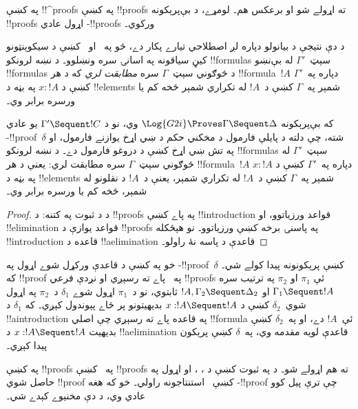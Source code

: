 \documentclass[../../../include/open-logic-section]{subfiles}
\begin{document}


په  کښې !!^{proof}s په  کښې
!!{proof}s ته اړولے شو او برعکس هم۔ لومړے، د بې‌پرېکونه
 !!{proof}s اړول عادي -!!{proof}s ورکوي۔

د دې نتيجې د بيانولو دپاره لږ اصطلاحي تيارے پکار دے، څو
په~ او~ کښې د سيکوېنټونو کيڼ سياقونه په
اسانۍ سره ونښلوو۔ د نښه لرونکو !!{formula}s سېټ~$\Gamma'$
له بې‌نښو !!{formula}s د څوګوني سېټ~$\Gamma$ سره
\emph{مطابقت لري} که د هر !!{formula}~$!A$ دپاره په~$\Gamma'$
کښې د $x : !A$ په بڼه د !!{element}s شمېر په~$\Gamma$ کښې
د~$!A$ له تکراري شمېر څخه کم يا ورسره برابر وي۔

\begin{cor}
که بې‌پرېکونه $\Log{G2i} \Proves \Gamma \Sequent \Delta$
وي، نو د $\Gamma' \Sequent !C$ يو عادي
-!!{proof}~$\delta$ شته، چې دلته د پايلې فارمول
د مخکني حکم د ښي اړخ يوازنے فارمول، او په تش ښي اړخ کښې
د دروغو فارمول دے۔ د نښه لرونکو !!{formula}s سېټ~$\Gamma'$
له څوګوني سېټ~$\Gamma$ سره مطابقت لري: يعنې د هر
!!{formula}~$!A$ دپاره په~$\Gamma'$ کښې د $x : !A$ په بڼه
د !!{element}s شمېر په~$\Gamma$ کښې د~$!A$ له تکراري شمېر،
يعنې د~$!A$ د نقلونو له شمېر، څخه کم يا ورسره برابر وي۔
\end{cor}

\begin{proof}
د  د ثبوت په کتنه: د
!!{proof}s په پاے کښې !!{introduction} قواعد ورزياتوو، او
!!{elimination} قواعد يوازې د !!{proof}s په پاسنۍ برخه کښې
ورزياتوو۔ نو هېڅکله !!{introduction} قاعده د
!!a{elimination} قاعدې د پاسه نۀ راولو۔
\end{proof}

خو په  کښې د \Cut{} قاعدې
ورکړل شوے اړول په -!!{proof}~$\delta$ کښې
پرېکونونه پيدا کولے شي۔ که  !!{proof} په~\Cut{}
پاے ته رسېږي او نږدې فرعي !!{proof}s ئې $\pi_1$ او $\pi_2$
په ترتيب سره $\Gamma_1 \Sequent !A$ او
$!A, \Gamma_2 \Sequent \Delta_2$ ثابتوي، نو د~$\pi_1$
اړول شوے $\delta_1$ د~$\pi_2$ په اړول شوي~$\delta_2$ کښې
د $x:!A \Sequent !A$ بديهيتونو پر ځاے پېوندول کېږي۔ که
$\delta_1$ د !!a{introduction} په قاعده پاے ته رسېږي چې
اصلي !!{formula} ئې~$!A$ دے، او په~$\delta_2$ کښې بديهيت
$x:!A \Sequent !A$ د !!a{elimination} قاعدې لويه مقدمه
وي، په~$\delta$ کښې پرېکون پيدا کېږي۔

په  کښې !!{proof}s په~ کښې
!!{proof}s ته هم اړولے شو۔ د 
په ثبوت کښې د \Elim{\land}، \Elim{\lif}، \Elim{\lnot}
او \Elim{\lforall} اړول په حاصل شوي  !!{proof}
کښې~\Cut{} استنتاجونه راولي۔ خو که هغه -!!{proof}
چې ترې پيل کوو عادي وي، د دې مخنيوے کېدے شي۔
\end{document}
